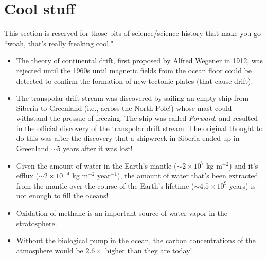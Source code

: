 \documentclass[11pt]{article}
\numberwithin{equation}{section}
\begin{document}
\section{Cool stuff}
This section is reserved for those bits of science/science history that make you go ``woah, that's really freaking cool." 
\begin{itemize}
\item The theory of continental drift, first proposed by Alfred Wegener in 1912, was rejected until the 1960s until magnetic fields from the ocean floor could be detected to confirm the formation of new tectonic plates (that cause drift).
\item The transpolar drift stream was discovered by sailing an empty ship from Siberia to Greenland (i.e., across the North Pole!) whose mast could withstand the pressue of freezing. The ship was called \textit{Forward}, and resulted in the official discovery of the transpolar drift stream. The original thought to do this was after the discovery that a shipwreck in Siberia ended up in Greenland $\sim$5 years after it was lost! 
\item Given the amount of water in the Earth’s mantle ($\sim 2 \times 10^7$ kg m$^{-2}$) and it’s efflux ($\sim 2 \times 10^{-4}$ kg m$^{-2}$ year$^{-1}$), the amount of water that’s been extracted from the mantle over the course of the Earth’s lifetime ($\sim 4.5 \times 10^9$ years) is not enough to fill the oceans! 
\item Oxidation of methane is an important source of water vapor in the stratosphere. 
\item Without the biological pump in the ocean, the carbon concentrations of the atmosphere would be $2.6\times$ higher than they are today! 
\end{itemize}
\end{document}
